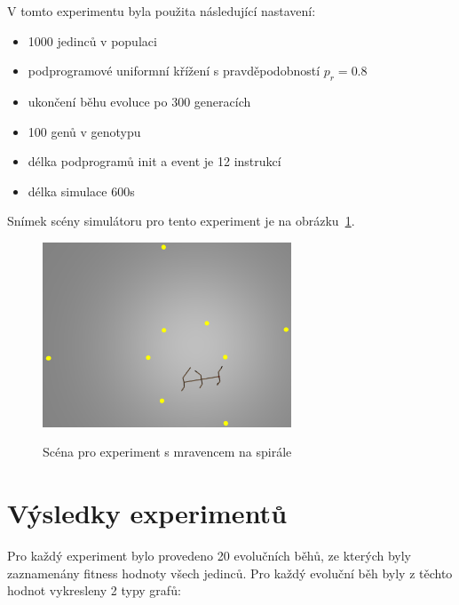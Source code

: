 V tomto experimentu byla použita následující nastavení:
\begin{itemize}
    \item 1000 jedinců v populaci
    \item podprogramové uniformní křížení s pravděpodobností $p_r = 0.8$
    \item ukončení běhu evoluce po 300 generacích
    \item 100 genů v genotypu
    \item délka podprogramů init a event je 12 instrukcí
    \item délka simulace 600s
\end{itemize}

Snímek scény simulátoru pro tento experiment je na obrázku~\ref{fig:mravenec_spirala_zhora}.
\begin{figure}[h]
    \centering
    {\includegraphics[width=20em]{obrazky/mravenec_spirala_zhora.png}}
    \caption{
    Scéna pro experiment s mravencem na spirále
    }
    \label{fig:mravenec_spirala_zhora}
\end{figure}


\chapter{Výsledky experimentů}
\label{chap:vysledky}
Pro každý experiment bylo provedeno 20 evolučních běhů, ze kterých byly zaznamenány fitness hodnoty všech jedinců.
Pro každý evoluční běh byly z těchto hodnot vykresleny 2 typy grafů:


